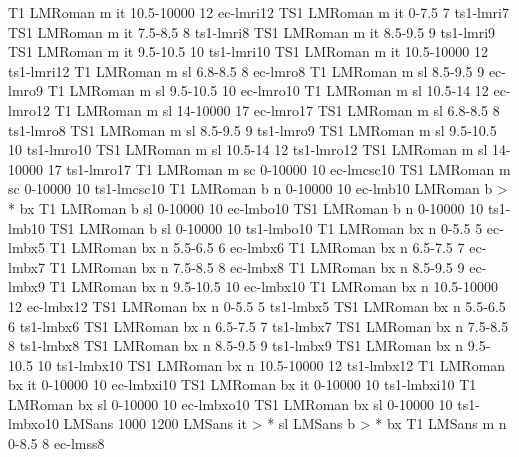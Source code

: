 \declarefont T1 LMRoman m   it 10.5-10000 12 ec-lmri12
\declarefont TS1 LMRoman m  it 0-7.5      7  ts1-lmri7
\declarefont TS1 LMRoman m  it 7.5-8.5    8  ts1-lmri8
\declarefont TS1 LMRoman m  it 8.5-9.5    9  ts1-lmri9
\declarefont TS1 LMRoman m  it 9.5-10.5   10 ts1-lmri10
\declarefont TS1 LMRoman m  it 10.5-10000 12 ts1-lmri12
\declarefont T1 LMRoman m   sl 6.8-8.5    8  ec-lmro8
\declarefont T1 LMRoman m   sl 8.5-9.5    9  ec-lmro9
\declarefont T1 LMRoman m   sl 9.5-10.5   10 ec-lmro10
\declarefont T1 LMRoman m   sl 10.5-14    12 ec-lmro12
\declarefont T1 LMRoman m   sl 14-10000   17 ec-lmro17
\declarefont TS1 LMRoman m  sl 6.8-8.5    8  ts1-lmro8
\declarefont TS1 LMRoman m  sl 8.5-9.5    9  ts1-lmro9
\declarefont TS1 LMRoman m  sl 9.5-10.5   10 ts1-lmro10
\declarefont TS1 LMRoman m  sl 10.5-14    12 ts1-lmro12
\declarefont TS1 LMRoman m  sl 14-10000   17 ts1-lmro17
\declarefont T1 LMRoman m   sc 0-10000    10 ec-lmcsc10
\declarefont TS1 LMRoman m  sc 0-10000    10 ts1-lmcsc10
%
\declarefont T1 LMRoman b   n  0-10000    10 ec-lmb10
\fontmapseries LMRoman b > * bx %
\declarefont T1 LMRoman b   sl 0-10000    10 ec-lmbo10
\declarefont TS1 LMRoman b  n  0-10000    10 ts1-lmb10
\declarefont TS1 LMRoman b  sl 0-10000    10 ts1-lmbo10
%
\declarefont T1 LMRoman bx  n  0-5.5      5  ec-lmbx5
\declarefont T1 LMRoman bx  n  5.5-6.5    6  ec-lmbx6
\declarefont T1 LMRoman bx  n  6.5-7.5    7  ec-lmbx7
\declarefont T1 LMRoman bx  n  7.5-8.5    8  ec-lmbx8
\declarefont T1 LMRoman bx  n  8.5-9.5    9  ec-lmbx9
\declarefont T1 LMRoman bx  n  9.5-10.5   10 ec-lmbx10
\declarefont T1 LMRoman bx  n  10.5-10000 12 ec-lmbx12
\declarefont TS1 LMRoman bx n  0-5.5      5  ts1-lmbx5
\declarefont TS1 LMRoman bx n  5.5-6.5    6  ts1-lmbx6
\declarefont TS1 LMRoman bx n  6.5-7.5    7  ts1-lmbx7
\declarefont TS1 LMRoman bx n  7.5-8.5    8  ts1-lmbx8
\declarefont TS1 LMRoman bx n  8.5-9.5    9  ts1-lmbx9
\declarefont TS1 LMRoman bx n  9.5-10.5   10 ts1-lmbx10
\declarefont TS1 LMRoman bx n  10.5-10000 12 ts1-lmbx12
\declarefont T1 LMRoman bx  it 0-10000    10 ec-lmbxi10
\declarefont TS1 LMRoman bx it 0-10000    10 ts1-lmbxi10
\declarefont T1 LMRoman bx  sl 0-10000    10 ec-lmbxo10
\declarefont TS1 LMRoman bx sl 0-10000    10 ts1-lmbxo10
%
%
\declarefontfamily LMSans 1000 1200
\fontmapshape LMSans it > * sl
\fontmapseries LMSans b > * bx
\declarefont T1 LMSans m   n  0-8.5     8  ec-lmss8
